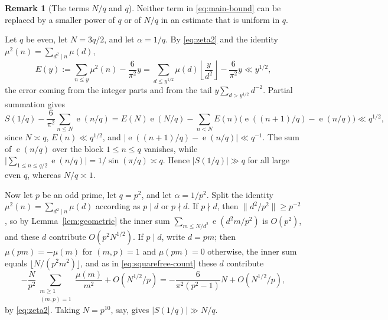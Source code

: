 \documentclass[11pt]{amsart}
\numberwithin{equation}{section}
\numberwithin{figure}{section}
\theoremstyle{definition}
\newtheorem{remark}{Remark}[section]
\newcommand{\e}{\operatorname{e}}
\begin{document}
\begin{remark}[The terms $N/q$ and $q$]\label{rem:sharp}
Neither term in \eqref{eq:main-bound} can be replaced by a smaller power
of $q$ or of $N/q$ in an estimate that is uniform in $q$.

Let $q$ be even, let $N=3q/2$, and let $\alpha=1/q$.  By
\eqref{eq:zeta2} and the identity $\mu^2(n)=\sum_{d^2\mid n}\mu(d)$,
\begin{equation}\label{eq:squarefree-count}
  E(y):=\sum_{n\le y}\mu^2(n)-\frac6{\pi^2}y
  =\sum_{d\le y^{1/2}}\mu(d)\left\lfloor\frac y{d^2}\right\rfloor
   -\frac6{\pi^2}y\ll y^{1/2},
\end{equation}
the error coming from the integer parts and from the tail
$y\sum_{d>y^{1/2}}d^{-2}$.  Partial summation gives
\[
  S(1/q)-\frac6{\pi^2}\sum_{n\le N}\e(n/q)
  =E(N)\e(N/q)-\sum_{n<N}E(n)\bigl(\e((n+1)/q)-\e(n/q)\bigr)
  \ll q^{1/2},
\]
since $N\asymp q$, $E(n)\ll q^{1/2}$, and
$|\e((n+1)/q)-\e(n/q)|\ll q^{-1}$.  The sum of $\e(n/q)$ over the block
$1\le n\le q$ vanishes, while
$\bigl|\sum_{1\le n\le q/2}\e(n/q)\bigr|=1/\sin(\pi/q)\asymp q$.  Hence
$|S(1/q)|\gg q$ for all large even $q$, whereas $N/q\asymp1$.

Now let $p$ be an odd prime, let $q=p^2$, and let $\alpha=1/p^2$.
Split the identity $\mu^2(n)=\sum_{d^2\mid n}\mu(d)$ according as
$p\mid d$ or $p\nmid d$.  If $p\nmid d$, then $\|d^2/p^2\|\ge p^{-2}$, so
by Lemma~\ref{lem:geometric} the inner sum $\sum_{m\le N/d^2}\e(d^2m/p^2)$
is $O(p^2)$, and these $d$ contribute $O(p^2N^{1/2})$.  If $p\mid d$,
write $d=pm$; then $\mu(pm)=-\mu(m)$ for $(m,p)=1$ and $\mu(pm)=0$
otherwise, the inner sum equals $\lfloor N/(p^2m^2)\rfloor$, and as in
\eqref{eq:squarefree-count} these $d$ contribute
\[
  -\frac N{p^2}\sum_{\substack{m\ge1\\(m,p)=1}}\frac{\mu(m)}{m^2}
  +O(N^{1/2}/p)
  =-\frac{6}{\pi^2(p^2-1)}N+O(N^{1/2}/p),
\]
by \eqref{eq:zeta2}.  Taking $N=p^{10}$, say, gives $|S(1/q)|\gg N/q$.


\end{remark}
\end{document}
